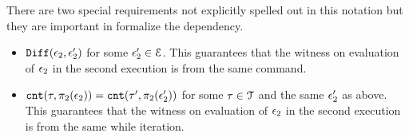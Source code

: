 There are two special requirements not explicitly spelled out in this notation but they are 
important in formalize the 
dependency. 
\begin{itemize}
\item $\mathtt{Diff}(\mathtt{\epsilon}_2, \mathtt{\epsilon}_2')$ for some $\mathtt{\epsilon}_2' \in \mathcal{E}$. 
This guarantees that the witness on evaluation of $\mathtt{\epsilon}_2$ in the second execution is 
from the same command.
\item $\mathtt{cnt}(\mathtt{\tau}, \pi_2(\mathtt{\epsilon}_2))
= 
\mathtt{cnt}(\mathtt{\tau}', \pi_2(\mathtt{\epsilon}_2'))$ for some $\mathtt{\tau} \in \mathcal{T}$ and the same $\mathtt{\epsilon}_2'$ as above.
This guarantees that the witness on evaluation of $\mathtt{\epsilon}_2$ in the second execution is 
from the same while iteration.
\end{itemize}
